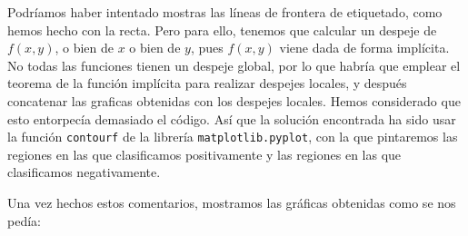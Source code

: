 \documentclass[11pt]{article}
\begin{document}
Podríamos haber intentado mostras las líneas de frontera de etiquetado, como hemos hecho con la recta. Pero para ello, tenemos que calcular un despeje de $f(x, y)$, o bien de $x$ o bien de $y$, pues $f(x, y)$ viene dada de forma implícita. No todas las funciones tienen un despeje global, por lo que habría que emplear el teorema de la función implícita para realizar despejes locales, y después concatenar las graficas obtenidas con los despejes locales. Hemos considerado que esto entorpecía demasiado el código. Así que la solución encontrada ha sido usar la función \lstinline{contourf} de la librería \lstinline{matplotlib.pyplot}, con la que pintaremos las regiones en las que clasificamos positivamente y las regiones en las que clasificamos negativamente.

Una vez hechos estos comentarios, mostramos las gráficas obtenidas como se nos pedía:
\end{document}
